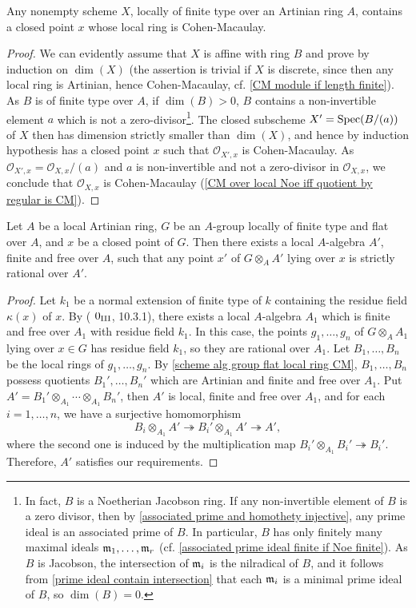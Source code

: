 \begin{lemma}\label{scheme local algebraic over Artinian CM closed point}
Any nonempty scheme $X$, locally of finite type over an Artinian ring $A$, contains a closed point $x$ whose local ring is Cohen-Macaulay. 
\end{lemma}
\begin{proof}
We can evidently assume that $X$ is affine with ring $B$ and prove by induction on $\dim(X)$ (the assertion is trivial if $X$ is discrete, since then any local ring is Artinian, hence Cohen-Macaulay, cf. \cref{CM module if length finite}). As $B$ is of finite type over $A$, if $\dim(B)>0$, $B$ contains a non-invertible element $a$ which is not a zero-divisor\footnote{In fact, $B$ is a Noetherian Jacobson ring. If any non-invertible element of $B$ is a zero divisor, then by \cref{associated prime and homothety injective}, any prime ideal is an associated prime of $B$. In particular, $B$ has only finitely many maximal ideals $\mathfrak{m}_1,\dots,\mathfrak{m}_r$ (cf. \cref{associated prime ideal finite if Noe finite}). As $B$ is Jacobson, the intersection of $\mathfrak{m}_i$ is the nilradical of $B$, and it follows from \cref{prime ideal contain intersection} that each $\mathfrak{m}_i$ is a minimal prime ideal of $B$, so $\dim(B)=0$.}. The closed subscheme $X'=\mathrm{Spec}(B/(a))$ of $X$ then has dimension strictly smaller than $\dim(X)$, and hence by induction hypothesis has a closed point $x$ such that $\mathscr{O}_{X',x}$ is Cohen-Macaulay. As $\mathscr{O}_{X',x}=\mathscr{O}_{X,x}/(a)$ and $a$ is non-invertible and not a zero-divisor in $\mathscr{O}_{X,x}$, we conclude that $\mathscr{O}_{X,x}$ is Cohen-Macaulay (\cref{CM over local Noe iff quotient by regular is CM}).
\end{proof}

\begin{proposition}\label{scheme alg group flat closed point locally rational}
Let $A$ be a local Artinian ring, $G$ be an $A$-group locally of finite type and flat over $A$, and $x$ be a closed point of $G$. Then there exists a local $A$-algebra $A'$, finite and free over $A$, such that any point $x'$ of $G\otimes_AA'$ lying over $x$ is strictly rational over $A'$.
\end{proposition}
\begin{proof}
Let $k_1$ be a normal extension of finite type of $k$ containing the residue field $\kappa(x)$ of $x$. By (\cite{EGA3} $0_{\Rmnum{3}}$, 10.3.1), there exists a local $A$-algebra $A_1$ which is finite and free over $A_1$ with residue field $k_1$. In this case, the points $g_1,\dots,g_n$ of $G\otimes_AA_1$ lying over $x\in G$ has residue field $k_1$, so they are rational over $A_1$. Let $B_1,\dots,B_n$ be the local rings of $g_1,\dots,g_n$. By \cref{scheme alg group flat local ring CM}, $B_1,\dots,B_n$ possess quotients $B_1',\dots,B_n'$ which are Artinian and finite and free over $A_1$. Put $A'=B_1'\otimes_{A_1}\cdots\otimes_{A_1}B_n'$, then $A'$ is local, finite and free over $A_1$, and for each $i=1,\dots,n$, we have a surjective homomorphism
\[B_i\otimes_{A_1}A'\twoheadrightarrow B_i'\otimes_{A_1}A'\twoheadrightarrow A',\]
where the second one is induced by the multiplication map $B_i'\otimes_{A_1}B_i'\twoheadrightarrow B_i'$. Therefore, $A'$ satisfies our requirements.
\end{proof}

